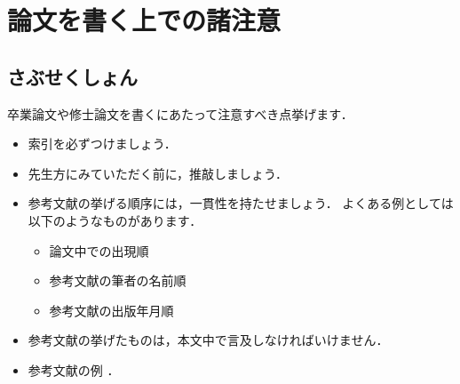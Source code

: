 \chapter{論文を書く上での諸注意}
\section{さぶせくしょん}

卒業論文や修士論文を書くにあたって注意すべき点挙げます．
\begin{itemize}
      \item 索引を必ずつけましょう．
      \item 先生方にみていただく前に，推敲しましょう．
      \item 参考文献の挙げる順序には，一貫性を持たせましょう．
            よくある例としては以下のようなものがあります．
            \begin{itemize}
                  \item 論文中での出現順
                  \item 参考文献の筆者の名前順
                  \item 参考文献の出版年月順
            \end{itemize}
      \item 参考文献の挙げたものは，本文中で言及しなければいけません．\cite{book2001}
      \item 参考文献の例 \cite{Thesis2001}．
\end{itemize}

